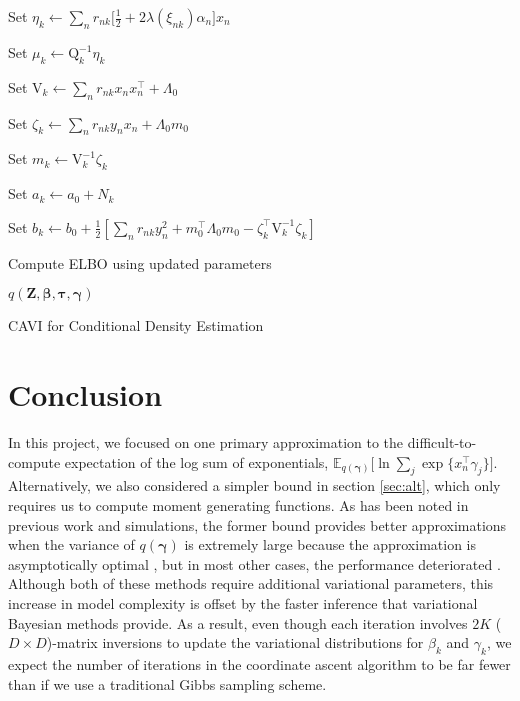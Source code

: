 \documentclass[twoside,11pt]{article}
\newcommand{\tr}{\intercal}
\newcommand{\transpose}[1]{#1^{\intercal}}
\newcommand{\nsum}{\sum\limits_{n}}
\newcommand{\boldbeta}{\boldsymbol\beta}
\newcommand{\boldgamma}{\boldsymbol\gamma}
\newcommand{\boldtau}{\boldsymbol\tau}
\newcommand{\E}{\mathbb{E}}
\begin{document}
\begin{algorithm}[H]
{{   Set $\eta_k \leftarrow \sum_{n} r_{nk} \big[ \frac{1}{2} + 2\lambda(\xi_{nk}) \alpha_n \big]x_n$\; %
         
   Set $\mu_k \leftarrow \mathrm{Q}_k^{-1} \eta_k$\; %
   
   Set $\mathrm{V}_k \leftarrow \nsum r_{nk} x_n \transpose{x_n} + \Lambda_0$ \; %
   
   Set $\zeta_k \leftarrow \sum_{n} r_{nk} y_n x_n + \Lambda_0 m_0$\; %
   
   Set $m_k \leftarrow \mathrm{V}_k^{-1} \zeta_k$\; %
   
   Set $a_k \leftarrow a_0 + N_k$\; %
   
   Set $b_k \leftarrow b_0 + \frac{1}{2}[\nsum r_{nk} y_n^2 + \transpose{m_0}\Lambda_0 m_0 - \transpose{\zeta_k} \mathrm{V}_k^{-1} \zeta_k]$\; %
   }
   Compute ELBO using updated parameters
 } %
 \Return $q \left( \mathbf{Z}, \boldbeta, \boldtau, \boldgamma \right)$
 \caption{CAVI for Conditional Density Estimation}
\end{algorithm}



\section{Conclusion}
In this project, we focused on one primary approximation to the difficult-to-compute expectation of the log sum of exponentials, $\E_{q(\boldsymbol\gamma)}\big[\ln \sum_{j} \exp \{ x_n^{\tr} \gamma_j \} \big]$. 
Alternatively, we also considered a simpler bound in section \ref{sec:alt}, which only requires us to compute moment generating functions. As has been noted in previous work and simulations, the former bound provides better approximations when the variance of $q(\boldgamma)$ is extremely large because the approximation is asymptotically optimal \parencite{bouchard:07}, but in most other cases, the performance deteriorated \parencite{Depraetere:17}. Although both of these methods require additional variational parameters, this increase in model complexity is offset by the faster inference that variational Bayesian methods provide. As a result, even though each iteration involves $2K$ ($D \times D$)-matrix inversions to update the variational distributions for $\beta_k$ and $\gamma_k$, we expect the number of iterations in the coordinate ascent algorithm to be far fewer than if we use a traditional Gibbs sampling scheme. \\
\end{document}
